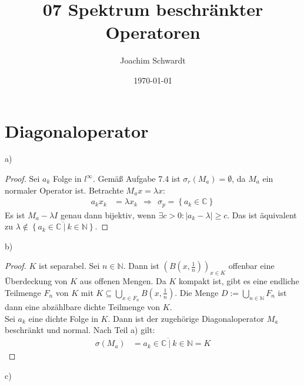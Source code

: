 \documentclass[a4paper,12pt]{article}
\newcommand{\kla}{}
\newcommand{\klammer}{}
\begin{document}
\title{07 Spektrum beschränkter Operatoren}
\author{Joachim Schwardt}
\date{\today}
\maketitle

\section{Diagonaloperator}
a)
\begin{proof}
Sei $a_k$ Folge in $l^\infty$. Gemäß Aufgabe 7.4 ist $\sigma_r(M_a)=\emptyset$, da $M_a$ ein normaler Operator ist. Betrachte $M_ax=\lambda x$:
\begin{align*}
a_kx_k&=\lambda x_k\ \ \Rightarrow\ \ \sigma_p=\klammer\left\{ {a_k\in\mathbb{C}} \right\}
\end{align*}
Es ist $M_a -\lambda I$ genau dann bijektiv, wenn $\exists c>0: |a_k-\lambda|\ge c$. Das ist äquivalent zu $\lambda\notin\overline{\klammer\left\{ {a_k\in\mathbb{C}\ \vert\ k\in\mathbb{N}} \right\}}$.
\end{proof}
b)
\begin{proof}
$K$ ist separabel. Sei $n\in\mathbb{N}$. Dann ist $\kla\left( {B(x,\frac{1}{n})} \right)_{x\in K}$ offenbar eine Überdeckung von $K$ aus offenen Mengen. Da $K$ kompakt ist, gibt es eine endliche Teilmenge $F_n$ von $K$ mit $K\subseteq\bigcup_{x\in F_n}B(x,\frac{1}{n})$. Die  Menge $D:=\bigcup_{n\in\mathbb{N}}F_n$ ist dann eine abzählbare dichte Teilmenge von $K$.\\
Sei $a_k$ eine dichte Folge in $K$. Dann ist der zugehörige Diagonaloperator $M_a$ beschränkt und normal. Nach Teil a) gilt:
\begin{align*}
\sigma (M_a)&=\overline{a_k\in\mathbb{C}\ \vert\ k\in\mathbb{N}}=K
\end{align*}
\end{proof}
c)
\end{document}
